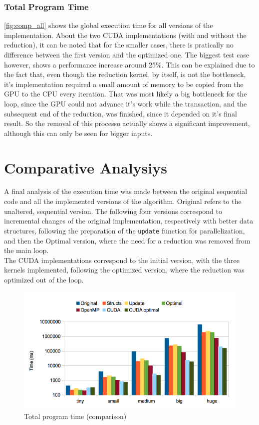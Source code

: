\documentclass[9pt,twocolumn]{scrartcl}
\begin{document}
\subsubsection{Total Program Time}

\autoref{fig:comp_all} shows the global execution time for all versions of the implementation. About the two CUDA implementations (with and without the reduction), it can be noted that for the smaller cases, there is pratically no difference between the first version and the optimized one. The biggest test case however, shows a performance increase around 25\%. This can be explained due to the fact that, even though the reduction kernel, by itself, is not the bottleneck, it's implementation required a small amount of memory to be copied from the GPU to the CPU every iteration. That was most likely a big bottleneck for the loop, since the GPU could not advance it's work while the transaction, and the subsequent end of the reduction, was finished, since it depended on it's final result. So the removal of this processo actually shows a significant improvement, although this can only be seen for bigger inputs.

\section{Comparative Analysiys}
\label{sec:comparison}

A final analysis of the execution time was made between the original sequential code and all the implemented versions of the algorithm. Original refers to the unaltered, sequential version. The following four versions correspond to incremental changes of the original implementation, respectively with better data structures, following the preparation of the \texttt{update} function for parallelization, and then the Optimal version, where the need for a reduction was removed from the main loop.\\

The CUDA implementations correspond to the initial version, with the three kernels implemented, following the optimized version, where the reduction was optimized out of the loop.

\begin{figure}[!hpt]
	\begin{center}
		\includegraphics[width=\columnwidth]{images/comp_all}
	\end{center}
	\caption{Total program time (comparison) \label{fig:comp_all}}
\end{figure}
\end{document}
